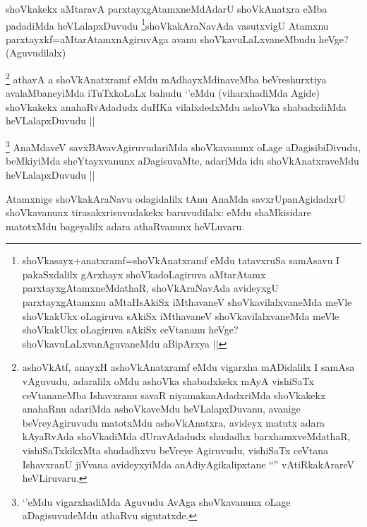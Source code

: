 
\begin{artha}
shoVkakekx aMtaravA parxtayxgAtamxneMdAdarU shoVkAnatxra eMba padadiMda heVLalapxDuvudu \footnote{shoVkasayx+anatxramf=shoVkAnatxramf eMdu tatavxruSa samAsavu I pakaSxdalilx gArxhayx shoVkadoLagiruva aMtarAtamx parxtayxgAtamxneMdathaR, shoVkAraNavAda avideyxgU parxtayxgAtamxnu aMtaHsAkiSx iMthavaneV shoVkavilalxvaneMda meVle shoVkakUkx oLagiruva sAkiSx iMthavaneV shoVkavilalxvaneMda meVle shoVkakUkx oLagiruva sAkiSx ceVtananu heVge? shoVkavuLaLxvanAguvaneMdu aBipArxya ||}shoVkakAraNavAda vasutxvigU Atamxnu parxtayxkf=aMtarAtamxnAgiruvAga avanu shoVkavuLaLxvaneMbudu heVge? (Aguvudilalx)
\end{artha}


\begin{artha}
\footnote{ashoVkAtf, anayxH ashoVkAnatxramf eMdu vigarxha mADidalilx I samAsa vAguvudu, adaralilx oMdu ashoVka shabadxkekx mAyA vishiSaTx ceVtananeMba Ishavxranu savaR niyamakanAdadxriMda shoVkakekx anahaRnu adariMda ashoVkaveMdu heVLalapxDuvanu, avanige beVreyAgiruvudu matotxMdu ashoVkAnatxra, avideyx matutx adara kAyaRvAda shoVkadiMda dUravAdadudx shudadhx barxhamxveMdathaR, vishiSaTxkikxMta shudadhxvu beVreye Agiruvudu, vishiSaTx ceVtana IshavxranU jiVvana avideyxyiMda anAdiyAgikalipxtane ``\stext'' vAtiRkakArareV heVLiruvaru.}
athavA a shoVkAnatxramf eMdu mAdhayxMdinaveMba beVreshurxtiya avalaMbaneyiMda iTuTxkoLaLx bahudu `\stext'eMdu (viharxhadiMda Agide) shoVkakekx anahaRvAdadudx duHKa vilalxdedxMdu ashoVka shabadxdiMda heVLalapxDuvudu ||
\end{artha}


\begin{artha}
\footnote{`\stext'eMdu vigarxhadiMda Aguvudu AvAga shoVkavanunx oLage aDagisuvudeMdu athaRvu sigutatxde.}
AnaMdaveV savxBAvavAgiruvudariMda shoVkavanunx oLage aDagisibiDivudu, beMkiyiMda sheYtayxvanunx aDagisuvaMte, adariMda idu shoVkAnatxraveMdu heVLalapxDuvudu ||
\end{artha}

\begin{artha}
Atamxnige shoVkakAraNavu odagidalilx tAnu AnaMda savxrUpanAgidadxrU shoVkavanunx tirasakxrisuvudakekx baruvudilalx: eMdu shaMkisidare matotxMdu bageyalilx adara athaRvanunx heVLuvaru.
\end{artha}

